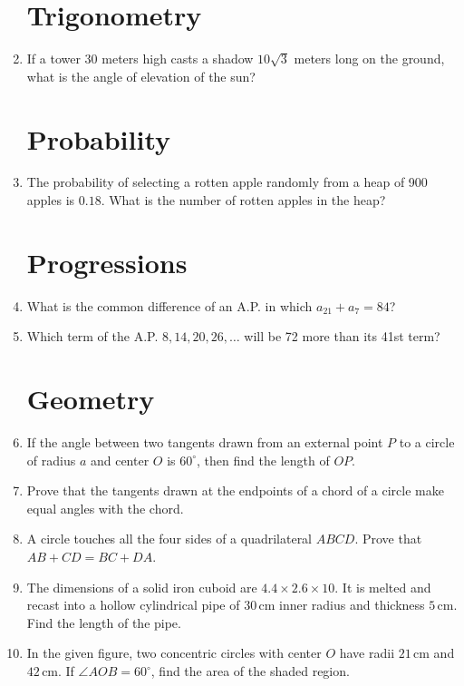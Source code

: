 \documentclass[12pt, letterpaper]{article}
\begin{document}
\begin{enumerate}
    \section*{Trigonometry}                                                                                                                
    \item If a tower $30$ meters high casts a shadow $10\sqrt{3}$ meters long on the ground, what is the angle of elevation of the sun?

    \section*{Probability}
    \item The probability of selecting a rotten apple randomly from a heap of 900 apples is $0.18$. What is the number of rotten apples in the heap?                                                                                                                          
    \section*{Progressions}                                                                                                                
    \item What is the common difference of an A.P. in which $a_{21} + a_{7} = 84$?
    \item Which term of the A.P. $8, 14, 20, 26, \ldots$ will be 72 more than its 41st term?

    \section*{Geometry}                                                                                                                    
    \item If the angle between two tangents drawn from an external point $P$ to a circle of radius $a$ and center $O$ is $60^\circ$, then find the length of $OP$.                                                                                                               
    \item Prove that the tangents drawn at the endpoints of a chord of a circle make equal angles with the chord.
    \item A circle touches all the four sides of a quadrilateral $ABCD$. Prove that $AB + CD = BC + DA$.
    \item The dimensions of a solid iron cuboid are $4.4 \times 2.6 \times 10$. It is melted and recast into a hollow cylindrical pipe of $30\,\mathrm{cm}$ inner radius and thickness $5\,\mathrm{cm}$. Find the length of the pipe.
    \item In the given figure, two concentric circles with center $O$ have radii $21\,\mathrm{cm}$ and $42\,\mathrm{cm}$. If $\angle AOB = 60^\circ$, find the area of the shaded region.


\end{enumerate}
\end{document}
